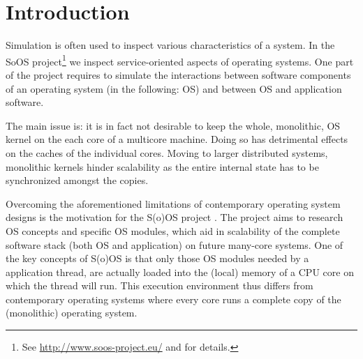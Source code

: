 \section{Introduction}

Simulation is often used to inspect various characteristics of a system.
In the SoOS project\footnote{See \url{http://www.soos-project.eu/} and \cite{soos} for details.} we inspect service-oriented aspects of operating systems.
One part of the project requires to simulate the interactions between software components of an operating system (in the following: OS) and between
OS and application software.

The main issue is: it is in fact not desirable to keep the whole, monolithic, OS kernel on the each core of a multicore machine.
Doing so has detrimental effects on the caches of the individual cores.
Moving to larger distributed systems, monolithic kernels hinder scalability as the entire internal state has to be synchronized amongst the copies.

Overcoming the aforementioned limitations of contemporary operating system designs is the motivation for the S(o)OS project \cite{soos}.
The project aims to research OS concepts and specific OS modules, which aid in scalability of the complete software stack (both OS and application) on future many-core systems.
One of the key concepts of S(o)OS is that only those OS modules needed by a application thread, are actually loaded into the (local) memory of a CPU core on which the thread will run.
This execution environment thus differs from contemporary operating systems where every core runs a complete copy of the (monolithic) operating system.

